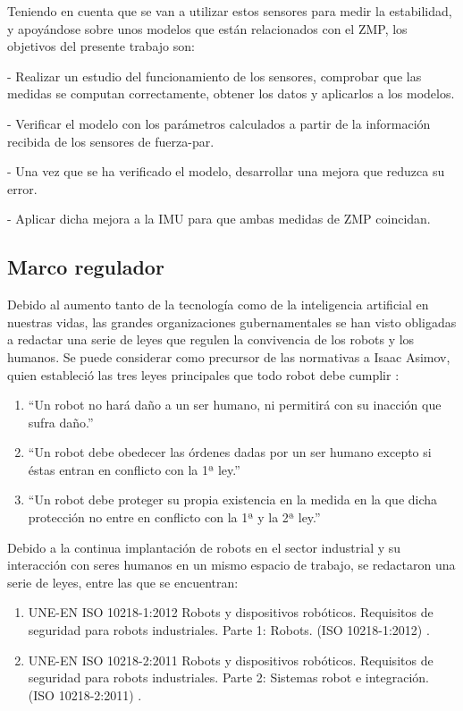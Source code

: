 Teniendo en cuenta que se van a utilizar estos sensores para medir la estabilidad, y apoyándose sobre unos modelos que están relacionados con el ZMP, los objetivos del presente trabajo son:

- Realizar un estudio del funcionamiento de los sensores, comprobar que las medidas se computan correctamente, obtener los datos y aplicarlos a los modelos.

- Verificar el modelo con los parámetros calculados a partir de la información recibida de los sensores de fuerza-par.

- Una vez que se ha verificado el modelo, desarrollar una mejora que reduzca su error.

- Aplicar dicha mejora a la IMU para que ambas medidas de ZMP coincidan.

\subsection{Marco regulador}

Debido al aumento tanto de la tecnología como de la inteligencia artificial en nuestras vidas, las grandes organizaciones gubernamentales se han visto obligadas a redactar una serie de leyes que regulen la convivencia de los robots y los humanos. Se puede considerar como precursor de las normativas a Isaac Asimov, quien estableció las tres leyes principales que todo robot debe cumplir \cite{ref1}:

\begin{enumerate}
\item ``Un robot no hará daño a un ser humano, ni permitirá con su inacción que sufra daño.''
\item ``Un robot debe obedecer las órdenes dadas por un ser humano excepto si éstas entran en conflicto con la 1ª ley.''
\item ``Un robot debe proteger su propia existencia en la medida en la que dicha protección no entre en conflicto con la 1ª y la 2ª ley.''
\end{enumerate}

Debido a la continua implantación de robots en el sector industrial y su interacción con seres humanos en un mismo espacio de trabajo, se redactaron una serie de leyes, entre las que se encuentran:

\begin{enumerate}

\item UNE-EN ISO 10218-1:2012 Robots y dispositivos robóticos. Requisitos de seguridad para robots industriales. Parte 1: Robots. (ISO 10218-1:2012) \cite{ref27}.

\item UNE-EN ISO 10218-2:2011 Robots y dispositivos robóticos. Requisitos de seguridad para robots industriales. Parte 2: Sistemas robot e integración. (ISO 10218-2:2011) \cite{ref28}.

\end{enumerate}

